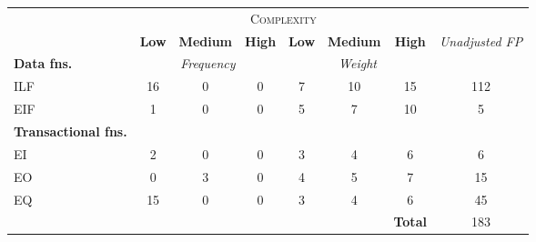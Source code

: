 
\begin{tabular}{|l|c|c|c|c|c|c|c|}
\cline{2-7}
\multicolumn{1}{c}{} & \multicolumn{6}{|c|}{\textsc{Complexity}} & \multicolumn{1}{c}{}  \\ \cline{2-8}
\multicolumn{1}{c|}{} & \textbf{Low} & \textbf{Medium} & \textbf{High} & \textbf{Low} & \textbf{Medium} & \textbf{High} & \multirow{2}{*}{\textit{Unadjusted FP}} \\ \cline{1-7}
\textbf{Data fns.} & \multicolumn{3}{|c|}{\textit{Frequency}} &  \multicolumn{3}{|c|}{\textit{Weight}} & \\ \hline
ILF 	& 16 & 0 & 0 & 7 & 10 & 15 & 112 	\\ \hline
EIF 	& 1  & 0 & 0 & 5 & 7  & 10 & 5		\\ \hline
\textbf{Transactional fns.} & \multicolumn{7}{|c|}{} \\ \hline
EI 		& 2  & 0 & 0 & 3 & 4  & 6  & 6 		\\ \hline
EO 		& 0  & 3 & 0 & 4 & 5  & 7  & 15		\\ \hline
EQ		& 15 & 0 & 0 & 3 & 4  & 6  & 45		\\ \hline
\multicolumn{6}{c|}{} & \textbf{Total} & 183 \\ \cline{7-8}
\end{tabular}
